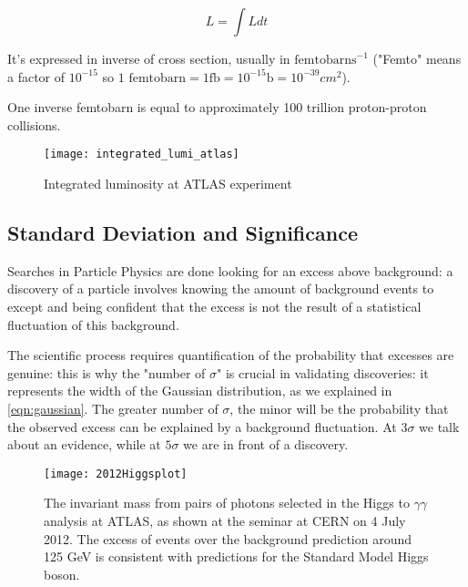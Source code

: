 \begin{equation}
	L = \int Ldt
\end{equation}

It's expressed in inverse of cross section, usually in $\text{femtobarns}^{-1}$ ("Femto" means a factor of $10^{-15}$ so $\text{1 femtobarn} = 1 \text{fb} = 10^{-15} \text{b} = 10^{-39} cm^2 $).

One inverse femtobarn is equal to approximately 100 trillion proton-proton collisions.

\begin{figure}
	\centerline{
		\texttt{[image: integrated\_lumi\_atlas]}}
	\caption{Integrated luminosity at ATLAS experiment \cite{Bruce:2016iew}}
\end{figure}

\subsection{Standard Deviation and Significance}

Searches in Particle Physics are done looking for an excess above background: a discovery of a particle involves knowing the amount of background events to except and being confident that the excess is not the result of a statistical fluctuation of this background.


The scientific process requires quantification of the probability that excesses are genuine: this is why the "number of $\sigma$" is crucial in validating discoveries: it represents the width of the Gaussian distribution, as we explained in \ref{eqn:gaussian}. The greater number of $\sigma$, the minor will be the probability that the observed excess can be explained by a background fluctuation.
At $3\sigma$ we talk about an evidence, while at $5\sigma$ we are in front of a discovery.

\begin{figure}
	\centerline{
		\texttt{[image: 2012Higgsplot]}}
	\caption{The invariant mass from pairs of photons selected in the Higgs to $\gamma\gamma$ analysis at ATLAS, as shown at the seminar at CERN on 4 July 2012. The excess of events over the background prediction around 125 GeV is consistent with predictions for the Standard Model Higgs boson.\cite{Collaboration:2627611}}
\end{figure}

